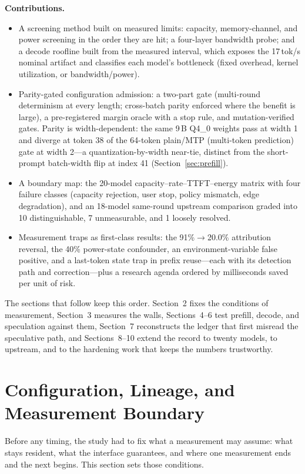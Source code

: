 \documentclass[letterpaper,twocolumn,10pt]{article}
\begin{document}
\textbf{Contributions.}
\begin{itemize}
\item[C1] A screening method built on measured limits: capacity, memory-channel,
and power screening in the order they are hit; a four-layer bandwidth probe; and a
decode roofline built from the measured interval, which exposes the
17\,tok/s nominal artifact and classifies each model's bottleneck (fixed
overhead, kernel utilization, or bandwidth/power).
\item[C2] Parity-gated configuration admission: a two-part gate (multi-round
determinism at every length; cross-batch parity enforced where the benefit is
large), a pre-registered margin oracle with a stop rule, and mutation-verified
gates. Parity is width-dependent: the same 9\,B Q4\_0 weights pass at width 1
and diverge at token 38 of the 64-token plain/MTP (multi-token prediction) gate
at width 2---a
quantization-by-width near-tie, distinct from the short-prompt batch-width
flip at index 41 (Section~\ref{sec:prefill}).
\item[C3] A boundary map: the 20-model capacity--rate--TTFT--energy matrix
with four failure classes (capacity rejection, user stop, policy mismatch,
edge degradation), and an 18-model same-round upstream comparison graded into
10 distinguishable, 7 unmeasurable, and 1 loosely resolved.
\item[C4] Measurement traps as first-class results: the
91\%$\rightarrow$20.0\% attribution reversal, the 40\% power-state confounder,
an environment-variable false positive, and a last-token state trap in prefix
reuse---each with its detection path and correction---plus a research agenda
ordered by milliseconds saved per unit of risk.
\end{itemize}

The sections that follow keep this order. Section~2 fixes the conditions of
measurement, Section~3 measures the walls, Sections~4--6 test prefill, decode,
and speculation against them, Section~7 reconstructs the ledger that first
misread the speculative path, and Sections~8--10 extend the record to twenty
models, to upstream, and to the hardening work that keeps the numbers
trustworthy.

\section{Configuration, Lineage, and Measurement Boundary}

Before any timing, the study had to fix what a measurement may assume: what
stays resident, what the interface guarantees, and where one measurement ends
and the next begins. This section sets those conditions.
\end{document}
